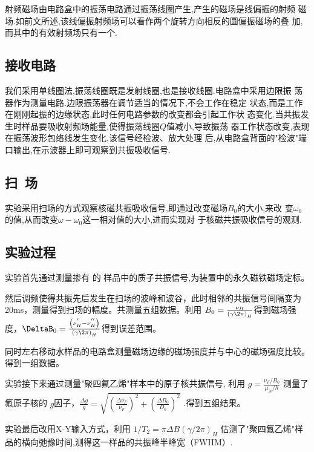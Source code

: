 \documentclass{buaaemp}
\newcommand{\sFeCl}[1]{\tup{FeCl\textsubscript{#1}}}
\newcommand{\sHIIO}{\tup{H\textsubscript{2}O}}
\begin{document}
射频磁场由电路盒中的振荡电路通过振荡线圈产生,产生的磁场是线偏振的射频
磁场.如前文所述,该线偏振射频场可以看作两个旋转方向相反的圆偏振磁场的叠
加,而其中的有效射频场只有一个.

\subsection{接收电路}

我们采用单线圈法,振荡线圈既是发射线圈,也是接收线圈.电路盒中采用边限振
荡器作为测量电路.边限振荡器在调节适当的情况下,不会工作在稳定
状态,而是工作在刚刚起振的边缘状态,此时任何电路参数的改变都会引起工作状
态变化.当共振发生时样品要吸收射频场能量,使得振荡线圈$Q$值减小,导致振荡
器工作状态改变,表现在振荡波形包络线发生变化,该信号经检波、放大处理
后,从电路盒背面的"检波"端口输出,在示波器上即可观察到共振吸收信号.

\subsection{扫~场}

实验采用扫场的方式观察核磁共振吸收信号,即通过改变磁场$B_0$的大小,来改
变$\omega_0$的值,从而改变$\omega-\omega_0$这一相对值的大小,进而实现对
于核磁共振吸收信号的观测.

\subsection{实验过程}
实验首先通过测量掺有 \sFeCl3 的 \sHIIO 样品中的质子共振信号,为装置中的永久磁铁磁场定标。

然后调频使得共振先后发生在扫场的波峰和波谷，此时相邻的共振信号间隔变为20ms，测量得到扫场的幅度。共测量五组数据。利用 $B_0= \frac{\nu_H}{\left( \gamma\2\pi \right)_H}$得到磁场强度，$\DeltaB_0= \frac{\left(\nu_H^{'} - \nu_H^{''}\right)}{\left( \gamma\2\pi \right)_H}$得到误差范围。

同时左右移动水样品的电路盒测量磁场边缘的磁场强度并与中心的磁场强度比较。得到一组数据。

实验接下来通过测量"聚四氟乙烯"样本中的原子核共振信号, 利用 $g=\frac{\nu_F / B_0}{\mu_N /h}$ 测量了氟原子核的
$g$因子，$\frac{\Delta g}{g}=\sqrt{\left(\frac{\Delta \nu_F}{\nu_F}\right)^2+\left(\frac{\Delta B_0}{D_0}\right)^2}$ .得到五组结果。

实验最后改用X-Y输入方式，利用 $1/T_2=\pi \Delta B(\gamma/2\pi)_H$ 估测了"聚四氟乙烯"样品的横向弛豫时间,测得这一样品的共振峰半峰宽（FWHM）.

\enlargethispage{-3.3cm}
\end{document}
